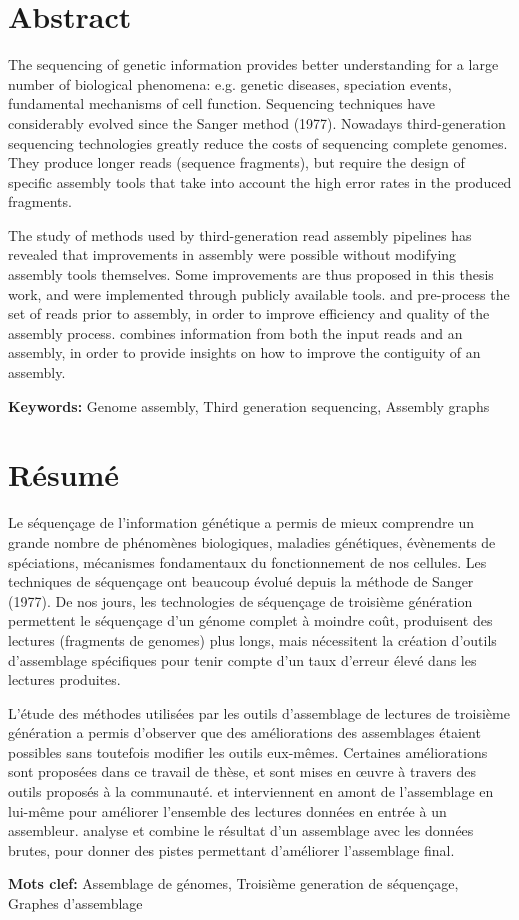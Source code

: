 \documentclass[main.tex]{subfiles}
\begin{document}
\thispagestyle{empty}

\section*{Abstract}

The sequencing of genetic information provides better understanding for a large number of biological phenomena: e.g. genetic diseases, speciation events, fundamental mechanisms of cell function. Sequencing techniques have considerably evolved since the Sanger method (1977). Nowadays third-generation sequencing technologies greatly reduce the costs of sequencing complete genomes. They produce longer reads (sequence fragments), but require the design of specific assembly tools that take into account the high error rates in the produced fragments.

The study of methods used by third-generation read assembly pipelines has revealed that improvements in assembly were possible without modifying assembly tools themselves. Some improvements are thus proposed in this thesis work, and were implemented through publicly available tools. \yacrd and \fpa pre-process the set of reads prior to assembly, in order to improve efficiency and quality of the assembly process. \knot combines information from both the input reads and an assembly, in order to provide insights on how to improve the contiguity of an assembly.

\textbf{Keywords:} Genome assembly, Third generation sequencing, Assembly graphs

\section*{Résumé}

Le séquençage de l'information génétique a permis de mieux comprendre un grande nombre de phénomènes biologiques, maladies génétiques, évènements de spéciations, mécanismes fondamentaux du fonctionnement de nos cellules. Les techniques de séquençage ont beaucoup évolué depuis la méthode de Sanger (1977). De nos jours, les technologies de séquençage de troisième génération permettent le séquençage d'un génome complet à moindre coût, produisent des lectures (fragments de genomes) plus longs, mais nécessitent la création d'outils d'assemblage spécifiques pour tenir compte d'un taux d'erreur élevé dans les lectures produites.

L'étude des méthodes utilisées par les outils d'assemblage de lectures de troisième génération a permis d'observer que des améliorations des assemblages étaient possibles sans toutefois modifier les outils eux-mêmes. Certaines améliorations sont proposées dans ce travail de thèse, et sont mises en œuvre à travers des outils proposés à la communauté. \yacrd et \fpa  interviennent en amont de l'assemblage en lui-même pour améliorer l'ensemble des lectures données en entrée à un assembleur. \knot analyse et combine le résultat d'un assemblage avec les données brutes, pour donner des pistes permettant d'améliorer l'assemblage final.

\textbf{Mots clef:} Assemblage de génomes, Troisième generation de séquençage, Graphes d'assemblage
\end{document}
